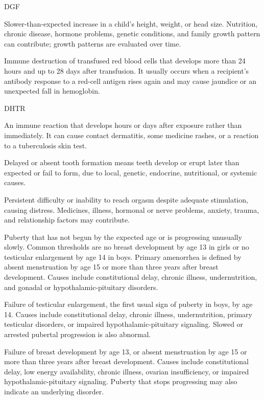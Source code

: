 \synonyms
DGF

 Slower-than-expected increase in a child’s height, weight, or head size. Nutrition, chronic disease, hormone problems, genetic conditions, and family growth pattern can contribute; growth patterns are evaluated over time.

 Immune destruction of transfused red blood cells that develops more than 24 hours and up to 28 days after transfusion. It usually occurs when a recipient’s antibody response to a red-cell antigen rises again and may cause jaundice or an unexpected fall in hemoglobin.

\synonyms
DHTR

 An immune reaction that develops hours or days after exposure rather than immediately. It can cause contact dermatitis, some medicine rashes, or a reaction to a tuberculosis skin test.

 Delayed or absent tooth formation means teeth develop or erupt later than expected or fail to form, due to local, genetic, endocrine, nutritional, or systemic causes.

 Persistent difficulty or inability to reach orgasm despite adequate stimulation, causing distress. Medicines, illness, hormonal or nerve problems, anxiety, trauma, and relationship factors may contribute.

 Puberty that has not begun by the expected age or is progressing unusually slowly.
Common thresholds are no breast development by age 13 in girls or no testicular enlargement by age 14 in boys.
Primary amenorrhea is defined by absent menstruation by age 15 or more than three years after breast development.
Causes include constitutional delay, chronic illness, undernutrition, and gonadal or hypothalamic-pituitary disorders.

 Failure of testicular enlargement, the first usual sign of puberty in boys, by age 14.
Causes include constitutional delay, chronic illness, undernutrition, primary testicular disorders,
or impaired hypothalamic-pituitary signaling. Slowed or arrested pubertal progression is also abnormal.

 Failure of breast development by age 13, or absent menstruation by age 15
or more than three years after breast development. Causes include constitutional delay, low energy availability,
chronic illness, ovarian insufficiency, or impaired hypothalamic-pituitary signaling.
Puberty that stops progressing may also indicate an underlying disorder.

